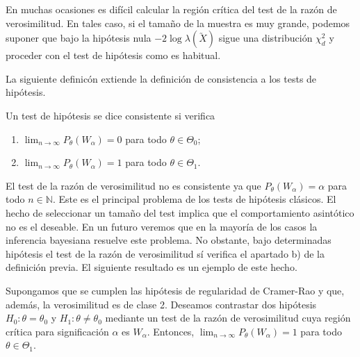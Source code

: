         En muchas ocasiones es difícil calcular la región crítica del test de la razón de verosimilitud. En tales caso, si el tamaño de la muestra es muy grande, podemos suponer que bajo la hipótesis nula $-2 \log \lambda(\utilde{X})$ sigue una distribución $\chi_d^2$ y proceder con el test de hipótesis como es habitual.

        La siguiente definicón extiende la definición de consistencia a los tests de hipótesis.

        \begin{definition}
            Un test de hipótesis se dice consistente si verifica
            \begin{enumerate}
                \item $\lim_{n \to \infty} P_{\theta}(W_\alpha) = 0$ para todo $\theta \in \Theta_0$;
                \item $\lim_{n \to \infty} P_{\theta}(W_\alpha) = 1$ para todo $\theta \in \Theta_1$.
            \end{enumerate}
        \end{definition}

        El test de la razón de verosimilitud no es consistente ya que $P_{\theta}(W_\alpha) = \alpha$ para todo $n \in \mathbb{N}$. Este es el principal problema de los tests de hipótesis clásicos. El hecho de seleccionar un tamaño del test implica que el comportamiento asintótico no es el deseable. En un futuro veremos que en la mayoría de los casos la inferencia bayesiana resuelve este problema. No obstante, bajo determinadas hipótesis el test de la razón de verosimilitud sí verifica el apartado b) de la definición previa. El siguiente resultado es un ejemplo de este hecho.

        \begin{prop}
            Supongamos que se cumplen las hipótesis de regularidad de Cramer-Rao y que, además, la verosimilitud es de clase 2. Deseamos contrastar dos hipótesis $H_0: \theta = \theta_0$ y $H_1: \theta \ne \theta_0$ mediante un test de la razón de verosimilitud cuya región crítica para significación $\alpha$ es $W_\alpha$. Entonces, $\lim_{n \to \infty} P_{\theta}(W_\alpha) = 1$ para todo $\theta \in \Theta_1$.
        \end{prop}

